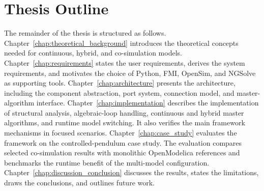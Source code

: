 \section{Thesis Outline}
\label{sec:intro_outline}

The remainder of the thesis is structured as follows.
Chapter~\ref{chap:theoretical_background} introduces the theoretical concepts needed for continuous, hybrid, and co-simulation models.
Chapter~\ref{chap:requirements} states the user requirements, derives the system requirements, and motivates the choice of Python, \ac{FMI}, OpenSim, and NGSolve as supporting tools.
Chapter~\ref{chap:architecture} presents the \syssimx{} architecture, including the component abstraction, port system, connection model, and master-algorithm interface.
Chapter~\ref{chap:implementation} describes the implementation of structural analysis, algebraic-loop handling, continuous and hybrid master algorithms, and runtime model switching.
It also verifies the main framework mechanisms in focused scenarios.
Chapter~\ref{chap:case_study} evaluates the framework on the controlled-pendulum case study.
The evaluation compares selected co-simulation results with monolithic OpenModelica references and benchmarks the runtime benefit of the multi-model configuration.
Chapter~\ref{chap:discussion_conclusion} discusses the results, states the limitations, draws the conclusions, and outlines future work.